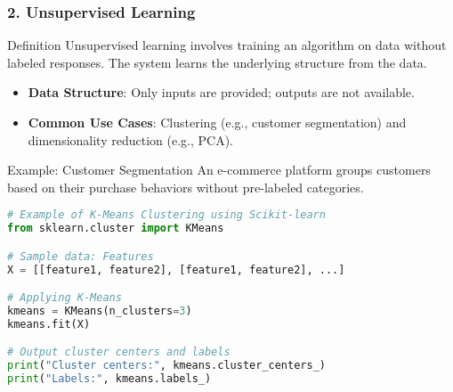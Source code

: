 \documentclass[aspectratio=169]{beamer}
\begin{document}
\begin{frame}[fragile]
    \frametitle{2. Unsupervised Learning}
    
    \begin{block}{Definition}
        Unsupervised learning involves training an algorithm on data without labeled responses. The system learns the underlying structure from the data.
    \end{block}

    \begin{itemize}
        \item \textbf{Data Structure}: Only inputs are provided; outputs are not available.
        \item \textbf{Common Use Cases}: Clustering (e.g., customer segmentation) and dimensionality reduction (e.g., PCA).
    \end{itemize}

    \begin{block}{Example: Customer Segmentation}
        An e-commerce platform groups customers based on their purchase behaviors without pre-labeled categories.
    \end{block}

    \begin{lstlisting}[language=Python, caption={K-Means Clustering Example}]
# Example of K-Means Clustering using Scikit-learn
from sklearn.cluster import KMeans

# Sample data: Features
X = [[feature1, feature2], [feature1, feature2], ...]

# Applying K-Means
kmeans = KMeans(n_clusters=3)
kmeans.fit(X)

# Output cluster centers and labels
print("Cluster centers:", kmeans.cluster_centers_)
print("Labels:", kmeans.labels_)
    \end{lstlisting}
\end{frame}
\end{document}
